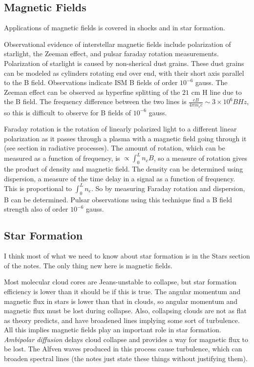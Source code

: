 \subsection{Magnetic Fields}
Applications of magnetic fields is covered in shocks and in star formation.  

Observational evidence of interstellar magnetic fields include polarization 
of starlight, the Zeeman effect, and pulsar faraday rotation measurements.  
Polarization of starlight is caused by non-sherical dust grains.  These dust 
grains can be modeled as cylinders rotating end over end, with their short 
axis parallel to the B field.  Observations indicate ISM B fields of order 
$10^{-6}$ gauss.  The Zeeman effect can be observed as hyperfine splitting 
of the $21$ cm H line due to the B field.  The frequency difference between 
the two lines is $\frac{eB}{4\pi m_ec}\sim3\times10^6B Hz$, so this is 
difficult to observe for B fields of $10^{-6}$ gauss.  

Faraday rotation is the rotation of linearly polarized light to a different 
linear polarization as it passes through a plasma with a magnetic field going 
through it (see section in radiative processes).  The amount of rotation, which 
can be measured as a function of frequency, is 
$\propto \int_0^L n_eB$, so a measure of rotation gives the product of density 
and magnetic field.  The density can be determined using dispersion, a measure 
of the time delay in a signal as a function of frequency.  This is proportional 
to $\int_0^L n_e$.  So by measuring Faraday rotation and dispersion, B can 
be determined.  Pulsar observations using this technique find a B field 
strength also of order $10^{-6}$ gauss. 

\subsection{Star Formation}
I think most of what we need to know about star formation is in the Stars 
section of the notes.  The only thing new here is magnetic fields.  

Most molecular cloud cores are Jeans-unstable to collapse, but star formation 
efficiency is lower than it should be if this is true.  The angular momentum 
and magnetic flux in stars is lower than that in clouds, so angular momentum 
and magnetic flux must be lost during collapse.  Also, collapsing clouds are 
not as flat as theory predicts, and have broadened lines implying some sort 
of turbulence.  All this implies magnetic fields play an important role in star 
formation.  \emph{Ambipolar diffusion} delays cloud collapse and provides a way 
for magnetic flux to be lost.  The Alfven waves produced in this process 
cause turbulence, which can broaden spectral lines (the notes just state these 
things without justifying them).   

